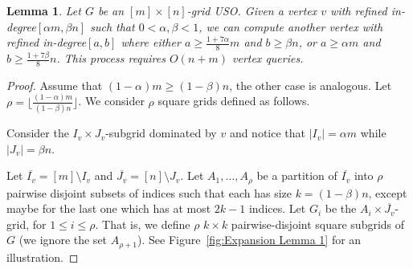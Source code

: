 \documentclass[a4paper,10pt]{article}
\newtheorem{lemma}{Lemma}
\newcommand{\indegree}{refined in-degree\xspace}
\begin{document}
\begin{lemma}\label{lemma:Constant fraction improvement}
Let $G$ be an $[m]\times[n]$-grid USO. 
Given a vertex $v$ with \indegree $[\alpha m, \beta n]$ such that $0 < \alpha, \beta < 1$, we can compute another vertex with \indegree $[a,b]$ where either $a\geq \frac{1+7\alpha}{8}m$ and $b \geq \beta n$, or $a \geq \alpha m$ and $b \geq \frac{1 + 7\beta}{8}n$. This process requires $O(n + m)$ vertex queries.
\end{lemma}

\begin{proof}
Assume that $(1-\alpha) m \geq (1-\beta)n$, the other case is analogous. 
Let $\rho = \lfloor \frac{(1-\alpha)m}{(1-\beta)n} \rfloor$.
We consider $\rho$ square grids defined as follows. 

Consider the  $I_v\times J_v$-subgrid dominated by $v$ and 
notice that $|I_v| = \alpha m$ while $|J_v| = \beta n$.

Let $\overline{I_v} = [m]\setminus I_v$ and $\overline{J_v} = [n]\setminus J_v$.
Let $A_1, \ldots, A_\rho$ be a partition of $\overline{I_v}$ into $\rho$ pairwise disjoint subsets of indices such that each has size $k = (1-\beta)n$, except maybe for the last one which has at most $2k-1$ indices.
Let $G_i$ be the $A_i\times \overline{J_v}$-grid, for $1\leq i\leq \rho$. That is, we define $\rho$ $k\times k$ pairwise-disjoint square subgrids of $G$ (we ignore the set $A_{\rho+1}$). See Figure~\ref{fig:Expansion Lemma 1} for an illustration.


\end{proof}
\end{document}
